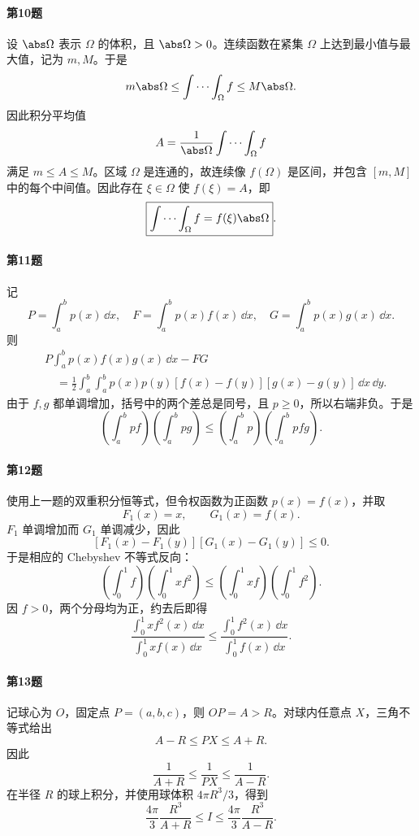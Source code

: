 \paragraph{第10题}
\begin{xsolution}
设 $\abs\Omega$ 表示 $\Omega$ 的体积，且 $\abs\Omega>0$。连续函数在紧集 $\Omega$ 上达到最小值与最大值，记为 $m,M$。于是
\[
  m\abs\Omega\le\int\cdots\int_\Omega f\le M\abs\Omega.
\]
因此积分平均值
\[
  A=\frac1{\abs\Omega}\int\cdots\int_\Omega f
\]
满足 $m\le A\le M$。区域 $\Omega$ 是连通的，故连续像 $f(\Omega)$ 是区间，并包含 $[m,M]$ 中的每个中间值。因此存在 $\xi\in\Omega$ 使 $f(\xi)=A$，即
\[
  \boxed{\int\cdots\int_\Omega f=f(\xi)\abs\Omega}.
\]
\end{xsolution}

\paragraph{第11题}
\begin{xsolution}
记
\[
  P=\int_a^bp(x)\,\dd x,
  \quad F=\int_a^bp(x)f(x)\,\dd x,
  \quad G=\int_a^bp(x)g(x)\,\dd x.
\]
则
\begin{align*}
 &P\int_a^bp(x)f(x)g(x)\,\dd x-FG\\
 &\quad=\frac12\int_a^b\int_a^b
 p(x)p(y)[f(x)-f(y)][g(x)-g(y)]\,\dd x\,\dd y.
\end{align*}
由于 $f,g$ 都单调增加，括号中的两个差总是同号，且 $p\ge0$，所以右端非负。于是
\[
  \left(\int_a^bp f\right)\left(\int_a^bp g\right)
  \le\left(\int_a^bp\right)\left(\int_a^bpfg\right).
\]
\end{xsolution}

\paragraph{第12题}
\begin{xsolution}
使用上一题的双重积分恒等式，但令权函数为正函数 $p(x)=f(x)$，并取
\[
  F_1(x)=x,
  \qquad G_1(x)=f(x).
\]
$F_1$ 单调增加而 $G_1$ 单调减少，因此
\[
 [F_1(x)-F_1(y)][G_1(x)-G_1(y)]\le0.
\]
于是相应的 Chebyshev 不等式反向：
\[
 \left(\int_0^1f\right)
 \left(\int_0^1x f^2\right)
 \le
 \left(\int_0^1x f\right)
 \left(\int_0^1 f^2\right).
\]
因 $f>0$，两个分母均为正，约去后即得
\[
  \boxed{
  \frac{\int_0^1x f^2(x)\,\dd x}{\int_0^1x f(x)\,\dd x}
  \le
  \frac{\int_0^1f^2(x)\,\dd x}{\int_0^1f(x)\,\dd x}}.
\]
\end{xsolution}

\paragraph{第13题}
\begin{xsolution}
记球心为 $O$，固定点 $P=(a,b,c)$，则 $OP=A>R$。对球内任意点 $X$，三角不等式给出
\[
  A-R\le PX\le A+R.
\]
因此
\[
  \frac1{A+R}\le\frac1{PX}\le\frac1{A-R}.
\]
在半径 $R$ 的球上积分，并使用球体积 $4\pi R^3/3$，得到
\[
  \boxed{
  \frac{4\pi}{3}\frac{R^3}{A+R}
  \le I\le
  \frac{4\pi}{3}\frac{R^3}{A-R}}.
\]
\end{xsolution}

